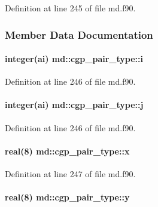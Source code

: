 Definition at line 245 of file md.\-f90.



\subsubsection{Member Data Documentation}
\hypertarget{structmd_1_1cgp__pair__type_a30c406706bc2cf9b4c875bc8c8c0ec69}{
\paragraph[{i}]{\setlength{\rightskip}{0pt plus 5cm}integer(ai) md\-::cgp\-\_\-pair\-\_\-type\-::i}}\label{structmd_1_1cgp__pair__type_a30c406706bc2cf9b4c875bc8c8c0ec69}


Definition at line 246 of file md.\-f90.

\hypertarget{structmd_1_1cgp__pair__type_a9177cf7fd4bc814564046885efdf05f5}{
\paragraph[{j}]{\setlength{\rightskip}{0pt plus 5cm}integer(ai) md\-::cgp\-\_\-pair\-\_\-type\-::j}}\label{structmd_1_1cgp__pair__type_a9177cf7fd4bc814564046885efdf05f5}


Definition at line 246 of file md.\-f90.

\hypertarget{structmd_1_1cgp__pair__type_a22d261487ad976d6d2d8f93d32a61387}{
\paragraph[{x}]{\setlength{\rightskip}{0pt plus 5cm}real(8) md\-::cgp\-\_\-pair\-\_\-type\-::x}}\label{structmd_1_1cgp__pair__type_a22d261487ad976d6d2d8f93d32a61387}


Definition at line 247 of file md.\-f90.

\hypertarget{structmd_1_1cgp__pair__type_aaea95754961401416dfd141e690b02f1}{
\paragraph[{y}]{\setlength{\rightskip}{0pt plus 5cm}real(8) md\-::cgp\-\_\-pair\-\_\-type\-::y}}\label{structmd_1_1cgp__pair__type_aaea95754961401416dfd141e690b02f1}


